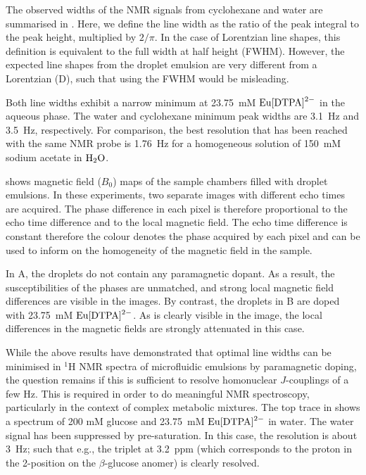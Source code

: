 The observed widths of the NMR signals from cyclohexane and water
are summarised in . Here, we define the line width as
the ratio of the peak integral to the peak height, multiplied by $2/\pi$. In the
case of Lorentzian line shapes, this definition is equivalent to the full width at half height
(FWHM). However, the expected line shapes from the droplet emulsion are very different
from a Lorentzian (D), such that using the FWHM would be misleading.

Both line widths exhibit a narrow
minimum at 23.75~mM $\ce{Eu[DTPA]^{2-}}$ in the aqueous phase. The water and
cyclohexane minimum peak widths are 3.1~Hz and 3.5~Hz, respectively. For comparison, the best resolution
that has been reached with the same NMR probe is 1.76~Hz for a homogeneous
solution of 150~mM sodium acetate in $\ce{H_2O}$.\citet{Finch:2016gv}

 shows magnetic field ($B_0$) maps of the sample chambers filled
with droplet emulsions.
In these experiments, two separate
images with different echo times are acquired. The phase difference in each pixel is therefore
proportional to the echo time difference and to the local magnetic field. The echo time difference is constant
therefore the colour denotes the phase acquired by each pixel and can be used to
inform on the homogeneity of the magnetic field in the sample.

In A, the droplets do not contain any paramagnetic dopant. As a result, the
susceptibilities of the phases are unmatched, and strong local magnetic field differences
are visible in the images. By contrast, the droplets in B are doped with 23.75~mM
$\ce{Eu[DTPA]^{2-}}$. As is clearly visible in the image, the local differences in the magnetic
fields are strongly attenuated in this case.

While the above results have demonstrated that optimal line widths can be minimised in $^1$H NMR
spectra of microfluidic emulsions by paramagnetic doping,
the question remains if this is sufficient to resolve homonuclear
$J$-couplings of a few Hz. This is required in order to do meaningful NMR spectroscopy,
particularly in the context of complex metabolic mixtures.
The top trace in  shows a spectrum of 200 mM glucose
and 23.75~mM $\ce{Eu[DTPA]^{2-}}$ in water. The water signal has been suppressed by pre-saturation.
In this case, the resolution is about 3~Hz; such that e.g., the triplet at 3.2~ppm (which corresponds
to the proton in the 2-position on the $\beta$-glucose anomer) is clearly resolved.

